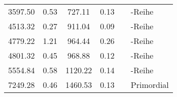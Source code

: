 \begin{tabular}{SSSSll}
3597.50     & 0.53   & 727.11        & 0.13   &  & -Reihe  \\
4513.32     & 0.27   & 911.04        & 0.09   &  & -Reihe  \\
4779.22     & 1.21   & 964.44        & 0.26   &  & -Reihe  \\
4801.32     & 0.45   & 968.88        & 0.12   &  & -Reihe  \\
5554.84     & 0.58   & 1120.22       & 0.14   &  & -Reihe   \\
7249.28     & 0.46   & 1460.53       & 0.13   &    & Primordial           \\ \bottomrule
\end{tabular}